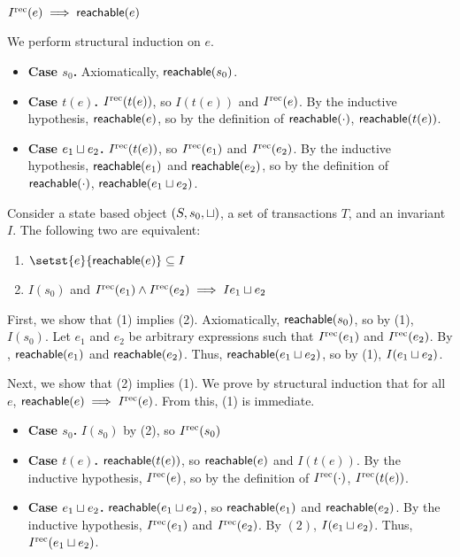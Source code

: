 \begin{claim}
  $I^{\text{rec}}(e) \implies \textsf{reachable}(e)$
\end{claim}
\begin{elidableproof}
  We perform structural induction on $e$.
  \begin{itemize}
    \item \textbf{Case $s_0$.}
      Axiomatically, $\textsf{reachable}(s_0)$.

    \item \textbf{Case $t(e)$.}
      $I^{\text{rec}}(t(e))$, so $I(t(e))$ and $I^{\text{rec}}(e)$. By the inductive hypothesis,
      $\textsf{reachable}(e)$, so by the definition of $\textsf{reachable}(\cdot)$,
      $\textsf{reachable}(t(e))$.

    \item \textbf{Case $e_1 \sqcup e_2$.}
      $I^{\text{rec}}(t(e))$, so $I^{\text{rec}}(e_1)$ and $I^{\text{rec}}(e_2)$. By the inductive
      hypothesis, $\textsf{reachable}(e_1)$ and $\textsf{reachable}(e_2)$, so by the definition
      of $\textsf{reachable}(\cdot)$, $\textsf{reachable}(e_1 \sqcup e_2)$.
  \end{itemize}
\end{elidableproof}

\begin{claim}
  Consider a state based object $(S, s_0, \sqcup)$, a set of transactions $T$,
  and an invariant $I$. The following two are equivalent:
  \begin{enumerate}[\quad(1)]
    \item
      $\setst{e}{\reachable{e}} \subseteq I$

    \item
      $I(s_0)$ and $I^{\text{rec}}(e_1) \land I^{\text{rec}}(e_2) \implies I{e_1 \sqcup e_2}$
  \end{enumerate}
\end{claim}
\begin{elidableproof}
  First, we show that (1) implies (2). Axiomatically, $\textsf{reachable}(s_0)$, so by
  (1), $I(s_0)$. Let $e_1$ and $e_2$ be arbitrary expressions such that
  $I^{\text{rec}}(e_1)$ and $I^{\text{rec}}(e_2)$. By ,
  $\textsf{reachable}(e_1)$ and $\textsf{reachable}(e_2)$. Thus, $\textsf{reachable}(e_1 \sqcup e_2)$,
  so by (1), $I(e_1 \sqcup e_2)$.

  Next, we show that (2) implies (1). We prove by structural induction that for
  all $e$, $\textsf{reachable}(e) \implies I^{\text{rec}}(e)$. From this, (1) is immediate.
  \begin{itemize}
    \item \textbf{Case $s_0$.}
      $I(s_0)$ by (2), so $I^{\text{rec}}(s_0)$

    \item \textbf{Case $t(e)$.}
      $\textsf{reachable}(t(e))$, so $\textsf{reachable}(e)$ and $I(t(e))$. By the inductive
      hypothesis, $I^{\text{rec}}(e)$, so by the definition of $I^{\text{rec}}(\cdot)$,
      $I^{\text{rec}}(t(e))$.

    \item \textbf{Case $e_1 \sqcup e_2$.}
      $\textsf{reachable}(e_1 \sqcup e_2)$, so $\textsf{reachable}(e_1)$ and $\textsf{reachable}(e_2)$.
      By the inductive hypothesis, $I^{\text{rec}}(e_1)$ and $I^{\text{rec}}(e_2)$. By $(2)$,
      $I(e_1 \sqcup e_2)$. Thus, $I^{\text{rec}}(e_1 \sqcup e_2)$.
  \end{itemize}
\end{elidableproof}

